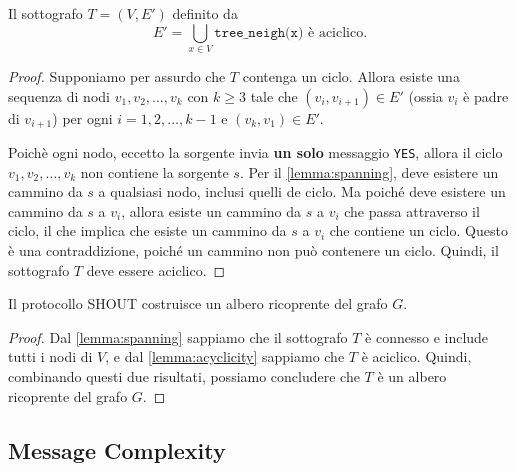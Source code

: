 \begin{lemma}[Aciclicità]\label{lemma:acyclicity}
    Il sottografo $T = (V, E')$ definito da 
    \[
        E' = \bigcup_{x \in V} \texttt{tree\_neigh(x)} \text{ è aciclico}.
    \]
    \begin{proof}
        Supponiamo per assurdo che $T$ contenga un ciclo. Allora esiste una sequenza di nodi $v_1, v_2, \ldots, v_k$ con $k \geq 3$ tale che $(v_i, v_{i+1}) \in E'$ (ossia $v_i$ è padre di $v_{i+1}$) per ogni $i = 1, 2, \ldots, k-1$ e $(v_k, v_1) \in E'$. 

        Poichè ogni nodo, eccetto la sorgente invia \textbf{un solo} messaggio \texttt{YES}, allora il ciclo $v_1, v_2, \ldots, v_k$ non contiene la sorgente $s$. Per il \autoref{lemma:spanning}, deve esistere un cammino da $s$ a qualsiasi nodo, inclusi quelli de ciclo. Ma poiché deve esistere un cammino da $s$ a $v_i$, allora esiste un cammino da $s$ a $v_i$ che passa attraverso il ciclo, il che implica che esiste un cammino da $s$ a $v_i$ che contiene un ciclo. Questo è una contraddizione, poiché un cammino non può contenere un ciclo. Quindi, il sottografo $T$ deve essere aciclico.
    \end{proof}
\end{lemma}

\begin{teorema}
    Il protocollo SHOUT costruisce un albero ricoprente del grafo $G$.
    \begin{proof}
        Dal \autoref{lemma:spanning} sappiamo che il sottografo $T$ è connesso e include tutti i nodi di $V$, e dal \autoref{lemma:acyclicity} sappiamo che $T$ è aciclico. Quindi, combinando questi due risultati, possiamo concludere che $T$ è un albero ricoprente del grafo $G$.
    \end{proof}
\end{teorema}

\subsection{Message Complexity}

